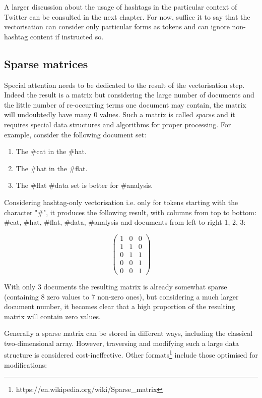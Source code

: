 \documentclass[12pt,a4paper,twoside]{report}
\begin{document}
A larger discussion about the usage of hashtags in the particular context of Twitter can be consulted in the next chapter. For now, suffice it to say that the vectorisation can consider only particular forms as tokens and can ignore non-hashtag content if instructed so.

\subsection{Sparse matrices}
Special attention needs to be dedicated to the result of the vectorisation step. Indeed the result is a matrix but considering the large number of documents and the little number of re-occurring terms one document may contain, the matrix will undoubtedly have many 0 values. Such a matrix is called \emph{sparse} and it requires special data structures and algorithms for proper processing. For example, consider the following document set:

\begin{enumerate}
\item The \#cat in the \#hat.
\item The \#hat in the \#flat.
\item The \#flat \#data set is better for \#analysis.
\end{enumerate}

Considering hashtag-only vectorisation i.e. only for tokens starting with the character "\#", it produces the following result, with columns from top to bottom: \#cat, \#hat, \#flat, \#data, \#analysis and documents from left to right 1, 2, 3:

\[ \left( \begin{array}{ccc}
1 & 0 & 0 \\
1 & 1 & 0 \\
0 & 1 & 1 \\
0 & 0 & 1 \\
0 & 0 & 1 \end{array} \right)\] 

With only 3 documents the resulting matrix is already somewhat sparse (containing 8 zero values to 7 non-zero ones), but considering a much larger document number, it becomes clear that a high proportion of the resulting matrix will contain zero values.

Generally a sparse matrix can be stored in different ways, including the classical two-dimensional array. However, traversing and modifying such a large data structure is considered cost-ineffective. Other formats\footnote{https://en.wikipedia.org/wiki/Sparse\_matrix} include those optimised for modifications:
\end{document}
